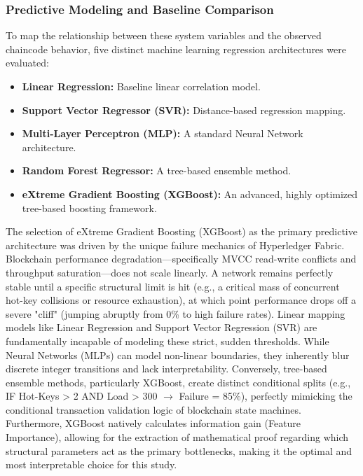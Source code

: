 \documentclass[12pt]{article}
\begin{document}
\subsubsection{Predictive Modeling and Baseline Comparison}

To map the relationship between these system variables and the observed chaincode behavior, five distinct machine learning regression architectures were evaluated:
\begin{itemize}
    \item \textbf{Linear Regression:} Baseline linear correlation model.
    \item \textbf{Support Vector Regressor (SVR):} Distance-based regression mapping.
    \item \textbf{Multi-Layer Perceptron (MLP):} A standard Neural Network architecture.
    \item \textbf{Random Forest Regressor:} A tree-based ensemble method.
    \item \textbf{eXtreme Gradient Boosting (XGBoost):} An advanced, highly optimized tree-based boosting framework.
\end{itemize}

The selection of eXtreme Gradient Boosting (XGBoost) as the primary predictive architecture was driven by the unique failure mechanics of Hyperledger Fabric. Blockchain performance degradation---specifically MVCC read-write conflicts and throughput saturation---does not scale linearly. A network remains perfectly stable until a specific structural limit is hit (e.g., a critical mass of concurrent hot-key collisions or resource exhaustion), at which point performance drops off a severe "cliff" (jumping abruptly from 0\% to high failure rates). Linear mapping models like Linear Regression and Support Vector Regression (SVR) are fundamentally incapable of modeling these strict, sudden thresholds. While Neural Networks (MLPs) can model non-linear boundaries, they inherently blur discrete integer transitions and lack interpretability. Conversely, tree-based ensemble methods, particularly XGBoost, create distinct conditional splits (e.g., IF Hot-Keys > 2 AND Load > 300 $\rightarrow$ Failure = 85\%), perfectly mimicking the conditional transaction validation logic of blockchain state machines. Furthermore, XGBoost natively calculates information gain (Feature Importance), allowing for the extraction of mathematical proof regarding which structural parameters act as the primary bottlenecks, making it the optimal and most interpretable choice for this study.
\end{document}
